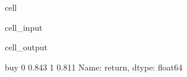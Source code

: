 \documentclass[letterpaper,10pt,english]{jupyterBook}
\begin{document}
\begin{sphinxuseclass}{cell}\begin{sphinxVerbatimInput}

\begin{sphinxuseclass}{cell_input}
\begin{sphinxVerbatim}[commandchars=\\\{\}]
\PYG{p}{[}\PYG{p}{]}
\end{sphinxVerbatim}

\end{sphinxuseclass}\end{sphinxVerbatimInput}
\begin{sphinxVerbatimOutput}

\begin{sphinxuseclass}{cell_output}
\begin{sphinxVerbatim}[commandchars=\\\{\}]
buy
0   0.843
1   0.811
Name: return, dtype: float64
\end{sphinxVerbatim}

\end{sphinxuseclass}\end{sphinxVerbatimOutput}

\end{sphinxuseclass}






\renewcommand{\indexname}{Index}
\printindex
\end{document}
